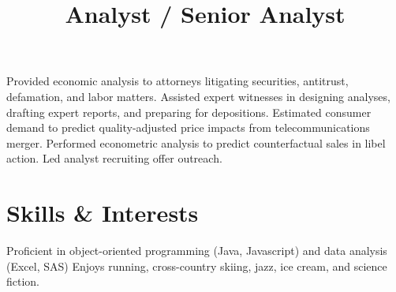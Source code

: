 \documentclass{res}
\begin{document}
\begin{resume}
	\title{Analyst / Senior Analyst}
	\begin{position}
		Provided economic analysis to attorneys litigating securities, antitrust, defamation, and labor matters. Assisted expert witnesses in designing analyses, drafting expert reports, and preparing for depositions. Estimated consumer demand to predict quality-adjusted price impacts from telecommunications merger. Performed econometric analysis to predict
counterfactual sales in libel action. Led analyst recruiting offer outreach.
	\end{position}


\section{Skills \& Interests}
	Proficient in object-oriented programming (Java, Javascript) and data analysis (Excel, SAS)
	Enjoys running, cross-country skiing, jazz, ice cream, and science fiction.

\end{resume}
\end{document}

